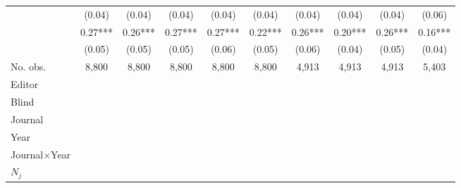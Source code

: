 \begin{table}
\begin{threeparttable}
\begin{tabular}{p{3cm}S@{}S@{}S@{}S@{}S@{}S@{}S@{}S@{}S@{}}
                                          &      (0.04)   &      (0.04)   &      (0.04)   &      (0.04)   &      (0.04)   &      (0.04)   &      (0.04)   &      (0.04)   &      (0.06)   \\
            &        0.27***&        0.26***&        0.27***&        0.27***&        0.22***&        0.26***&        0.20***&        0.26***&        0.16***\\
                                          &      (0.05)   &      (0.05)   &      (0.05)   &      (0.06)   &      (0.05)   &      (0.06)   &      (0.04)   &      (0.05)   &      (0.04)   \\
            \midrule
            No. obs.                      &       8,800   &       8,800   &       8,800   &       8,800   &       8,800   &       4,913   &       4,913   &       4,913   &       5,403   \\
            \midrule
            Editor                &           {}   &           {}   &           {}   &           {}   &           {}   &           {}   &           {}   &           {}   &           {}   \\
            Blind                         &           {}   &           {}   &           {}   &           {}   &           {}   &           {}   &           {}   &           {}   &           {}   \\
            Journal                       &           {}   &           {}   &               &               &               &               &               &               &               \\
            Year                          &               &           {}   &               &               &               &               &               &               &               \\
            Journal\(\times\)Year                  &               &               &           {}   &           {}   &           {}   &           {}   &           {}   &           {}   &           {}   \\
            \(N_j\)                       &               &               &               &           {}   &           {}   &           {}   &           {}   &           {}   &           {}   \\

\end{tabular}
\end{threeparttable}
\end{table}
